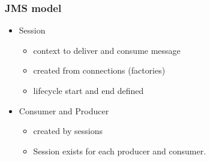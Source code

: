 \documentclass[10pt,xcolor=pdflatex]{beamer}
\begin{document}
\begin{frame}[containsverbatim]\frametitle{JMS model}
\begin{itemize}
	\item Session
	  \begin{itemize}
		\item context to deliver and consume message
		\item created from connections (factories)
		\item lifecycle start and end defined
	  \end{itemize}
    \item Consumer and Producer
	  \begin{itemize}
		\item created by sessions
		\item Session exists for each producer and consumer.
	  \end{itemize}
\end{itemize}
\end{frame}
\end{document}
